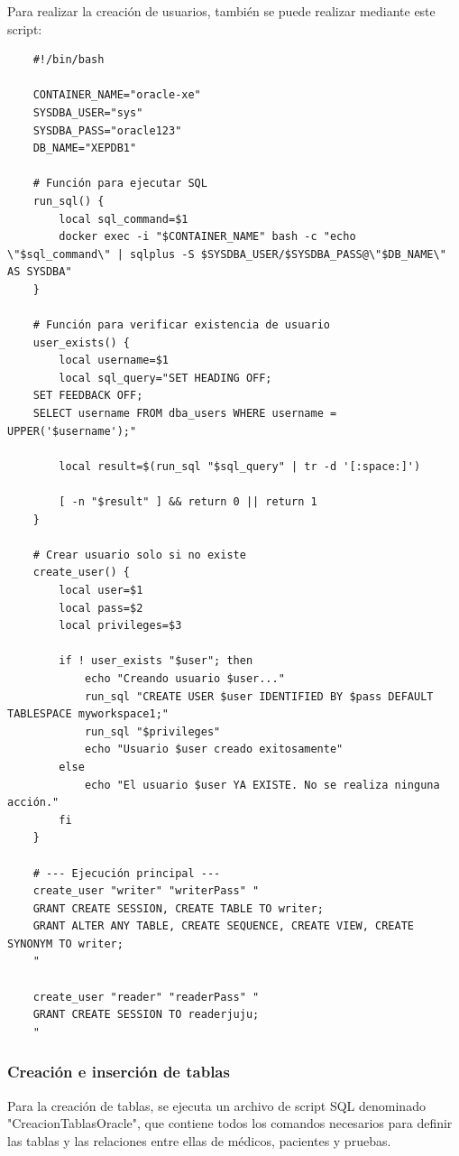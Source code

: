 \documentclass{article}
\begin{document}
Para realizar la creación de usuarios, también se puede realizar mediante este script:
\begin{verbatim}
    #!/bin/bash

    CONTAINER_NAME="oracle-xe"
    SYSDBA_USER="sys"
    SYSDBA_PASS="oracle123"
    DB_NAME="XEPDB1"
    
    # Función para ejecutar SQL
    run_sql() {
        local sql_command=$1
        docker exec -i "$CONTAINER_NAME" bash -c "echo \"$sql_command\" | sqlplus -S $SYSDBA_USER/$SYSDBA_PASS@\"$DB_NAME\" AS SYSDBA"
    }
    
    # Función para verificar existencia de usuario
    user_exists() {
        local username=$1
        local sql_query="SET HEADING OFF; 
    SET FEEDBACK OFF; 
    SELECT username FROM dba_users WHERE username = UPPER('$username');"
    
        local result=$(run_sql "$sql_query" | tr -d '[:space:]')
        
        [ -n "$result" ] && return 0 || return 1
    }
    
    # Crear usuario solo si no existe
    create_user() {
        local user=$1
        local pass=$2
        local privileges=$3
    
        if ! user_exists "$user"; then
            echo "Creando usuario $user..."
            run_sql "CREATE USER $user IDENTIFIED BY $pass DEFAULT TABLESPACE myworkspace1;"
            run_sql "$privileges"
            echo "Usuario $user creado exitosamente"
        else
            echo "El usuario $user YA EXISTE. No se realiza ninguna acción."
        fi
    }
    
    # --- Ejecución principal ---
    create_user "writer" "writerPass" "
    GRANT CREATE SESSION, CREATE TABLE TO writer;
    GRANT ALTER ANY TABLE, CREATE SEQUENCE, CREATE VIEW, CREATE SYNONYM TO writer;
    "
    
    create_user "reader" "readerPass" "
    GRANT CREATE SESSION TO readerjuju;
    "    
\end{verbatim}

\subsubsection{Creación e inserción de tablas}
Para la creación de tablas, se ejecuta un archivo de script SQL denominado "CreacionTablasOracle", que contiene todos los comandos necesarios para definir las tablas y las relaciones entre ellas de médicos, pacientes y pruebas. 
\end{document}
